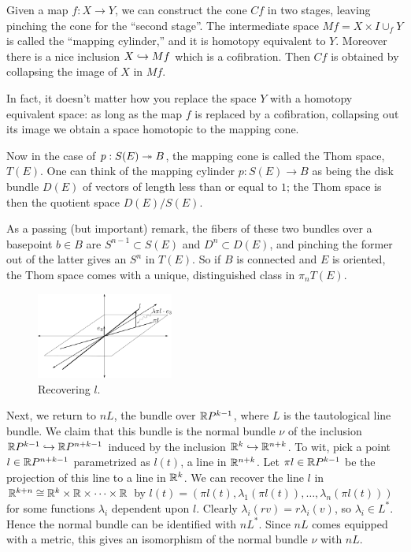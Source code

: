 Given a map $f:X\to Y$, we can construct the cone $Cf$ in two stages, leaving pinching the cone for the ``second stage''. The intermediate space $Mf=X\times I\cup_f Y$ is called the ``mapping cylinder,'' and it is homotopy equivalent to $Y$.  Moreover there is a nice inclusion $X \hookrightarrow Mf$ which is a cofibration. Then $Cf$ is obtained by collapsing the image of $X$ in $Mf$.

In fact, it doesn't matter how you replace the space $Y$ with a homotopy equivalent space: as long as the map $f$ is replaced by a cofibration, collapsing out its image we obtain a space homotopic to the mapping cone.

Now in the case of $p: S(E) \twoheadrightarrow B$, the mapping cone is called the Thom space, $T(E)$. 
One can think of the mapping cylinder $p:S(E)\to B$ as being the disk bundle $D(E)$ of vectors of length less than or equal to $1$; the Thom space is then the quotient space $D(E) / S(E)$. 

As a passing (but important) remark, the fibers of these two bundles over a basepoint $b \in B$ are $S^{n-1} \subset S(E)$ and $D^n \subset D(E)$, and pinching the former out of the latter gives an $S^n$ in $T(E)$.  So if $B$ is connected and $E$ is oriented, the Thom space comes with a unique, distinguished class in $\pi_n T(E)$.

\begin{figure}
\centering\includegraphics[width=0.4\textwidth]{figures/fig8.pdf}
\caption{\small Recovering $l$.}
\end{figure} %
Next, we return to $nL$, the bundle over $\mathbb{R} P^{k-1}$, where $L$ is the tautological line bundle.  We claim that this bundle is the normal bundle $\nu$ of the inclusion $\mathbb{R} P^{k-1} \hookrightarrow \mathbb{R} P^{n+k-1}$ induced by the inclusion $\mathbb{R}^k \hookrightarrow \mathbb{R}^{n+k}$.  To wit, pick a point $l \in \mathbb{R} P^{n+k-1}$ parametrized as $l(t)$, a line in $\mathbb{R}^{n+k}$.  Let $\pi l \in \mathbb{R} P^{k-1}$ be the projection of this line to a line in $\mathbb{R}^k$.  We can recover the line $l$ in $\mathbb{R}^{k+n} \cong \mathbb{R}^k \times \mathbb{R} \times \cdots \times \mathbb{R}$ by $l(t) = (\pi l(t), \lambda_1(\pi l(t)), \ldots, \lambda_n(\pi l(t)))$ for some functions $\lambda_i$ dependent upon $l$.  Clearly $\lambda_i(rv) = r \lambda_i(v)$, so $\lambda_i \in L^*$.  Hence the normal bundle can be identified with $nL^*$.  Since $nL$ comes equipped with a metric, this gives an isomorphism of the normal bundle $\nu$ with $nL$.

